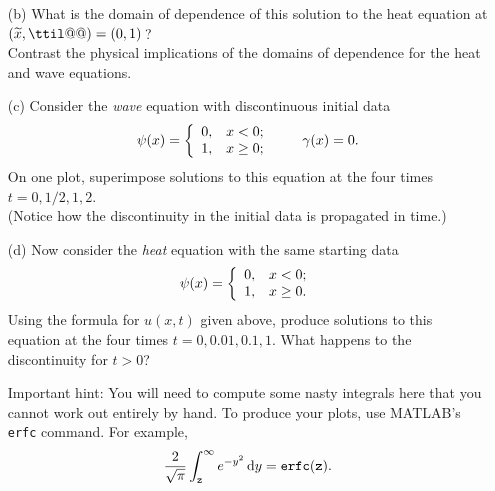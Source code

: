 \begin{enumerate}
\item[(b)] What is the domain of dependence of this solution to the
      heat equation at $(\xt,\ttil@@)=(0,1)$\,?\\
      Contrast the physical implications of the domains of dependence
      for the heat and wave equations.

\vspace*{1em}
\item[(c)] Consider the \emph{wave} equation with discontinuous 
      initial data
     \[ \psi(x) = \left\{\begin{array}{ll} 0, & x < 0; \cr 1, & x\ge 0;
                   \end{array}\right. \qquad
        \gamma(x) = 0.\]
      On one plot, superimpose solutions to this equation at the four times $t=0, 1/2, 1, 2$.\\
      (Notice how the discontinuity in the initial data is propagated in time.)

\vspace*{1em}
\item[(d)] Now consider the \emph{heat} equation with the same starting data
     \[ \psi(x) = \left\{\begin{array}{ll} 0, & x < 0; \cr 1, & x\ge 0.
                   \end{array}\right.\]
      Using the formula for $u(x,t)$ given above, produce solutions to this equation
      at the four times $t=0, 0.01, 0.1, 1$.  What happens to the discontinuity for $t>0$?

      \vspace*{1em}
      Important hint: You will need to compute some nasty integrals here that you
      cannot work out entirely by hand.  To produce your plots, use MATLAB's 
      \verb|erfc| command.  For example,
      \[  {2\over \sqrt{\pi}} \int_{\tt z}^\infty e^{-y^2} \, {\rm d} y = {\tt erfc(z)}.\]
\end{enumerate}


